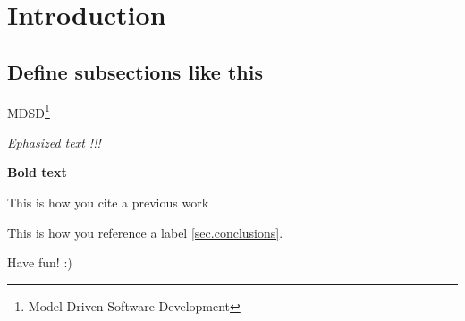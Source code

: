 \section{Introduction}
\label{sec.introduction}

\subsection{Define subsections like this}

MDSD\footnote{Model Driven Software Development}

\emph{Ephasized text !!!}

{\bf Bold text}

This is how you cite a previous work\cite{Pressman:2000}

This is how you reference a label \ref{sec.conclusions}.

Have fun! :)